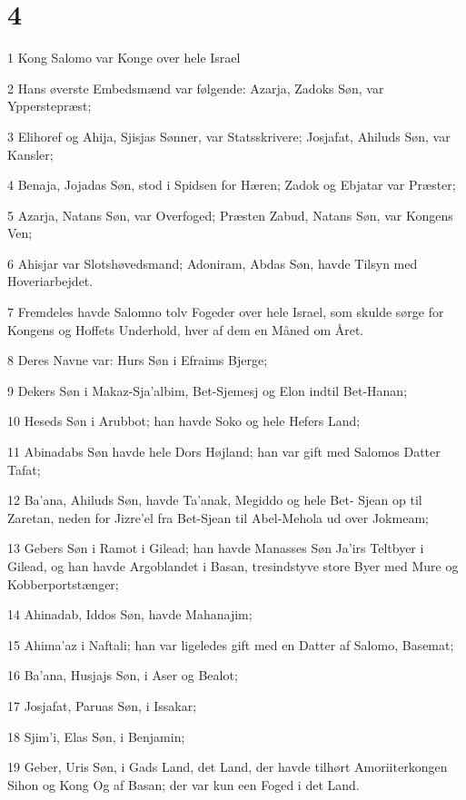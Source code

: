 \chapter{4}

\par 1 Kong Salomo var Konge over hele Israel
\par 2 Hans øverste Embedsmænd var følgende: Azarja, Zadoks Søn, var Ypperstepræst;
\par 3 Elihoref og Ahija, Sjisjas Sønner, var Statsskrivere; Josjafat, Ahiluds Søn, var Kansler;
\par 4 Benaja, Jojadas Søn, stod i Spidsen for Hæren; Zadok og Ebjatar var Præster;
\par 5 Azarja, Natans Søn, var Overfoged; Præsten Zabud, Natans Søn, var Kongens Ven;
\par 6 Ahisjar var Slotshøvedsmand; Adoniram, Abdas Søn, havde Tilsyn med Hoveriarbejdet.
\par 7 Fremdeles havde Salomno tolv Fogeder over hele Israel, som skulde sørge for Kongens og Hoffets Underhold, hver af dem en Måned om Året.
\par 8 Deres Navne var: Hurs Søn i Efraims Bjerge;
\par 9 Dekers Søn i Makaz-Sja'albim, Bet-Sjemesj og Elon indtil Bet-Hanan;
\par 10 Heseds Søn i Arubbot; han havde Soko og hele Hefers Land;
\par 11 Abinadabs Søn havde hele Dors Højland; han var gift med Salomos Datter Tafat;
\par 12 Ba'ana, Ahiluds Søn, havde Ta'anak, Megiddo og hele Bet- Sjean op til Zaretan, neden for Jizre'el fra Bet-Sjean til Abel-Mehola ud over Jokmeam;
\par 13 Gebers Søn i Ramot i Gilead; han havde Manasses Søn Ja'irs Teltbyer i Gilead, og han havde Argoblandet i Basan, tresindstyve store Byer med Mure og Kobberportstænger;
\par 14 Ahinadab, Iddos Søn, havde Mahanajim;
\par 15 Ahima'az i Naftali; han var ligeledes gift med en Datter af Salomo, Basemat;
\par 16 Ba'ana, Husjajs Søn, i Aser og Bealot;
\par 17 Josjafat, Paruas Søn, i Issakar;
\par 18 Sjim'i, Elas Søn, i Benjamin;
\par 19 Geber, Uris Søn, i Gads Land, det Land, der havde tilhørt Amoriiterkongen Sihon og Kong Og af Basan; der var kun een Foged i det Land.
